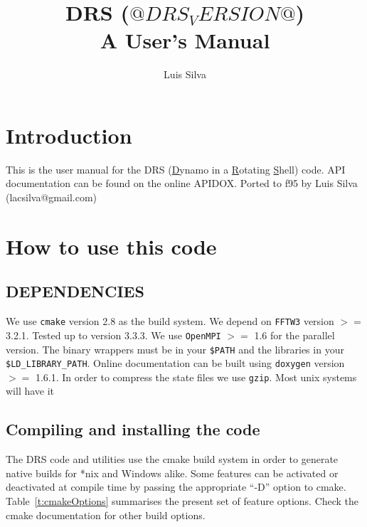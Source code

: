 \documentclass[a4paper,10pt]{book}
\title{DRS ($@DRS_VERSION@$) \\ A User's Manual}
\author{Luis Silva}
\begin{document}

\maketitle

\clearpage{}

\tableofcontents

\clearpage{}
\chapter*{Introduction}
This is the user manual for the DRS (\underline{D}ynamo in a
\underline{R}otating \underline{S}hell) code. API documentation can be found on
the online APIDOX.
Ported to f95 by Luis Silva (lacsilva@gmail.com)

\chapter{How to use this code}

\section{DEPENDENCIES}
We use \verb|cmake| version 2.8 as the build system.
We depend on \verb|FFTW3| version $>=$ 3.2.1. Tested up to version 3.3.3.
We use \verb|OpenMPI| $>=$ 1.6 for the parallel version. The binary wrappers must
be in your \verb|$PATH| and the libraries in your \verb|$LD_LIBRARY_PATH|.
Online documentation can be built using \verb|doxygen|  version $>=$ 1.6.1.
In order to compress the state files we use \verb|gzip|. Most unix systems will have it

\section{Compiling and installing the code}
The DRS code and utilities use the cmake build system in order to generate
native builds for *nix and Windows alike. Some features can be activated or
deactivated at compile time by passing the appropriate ``-D'' option to cmake.
Table~\ref{t:cmakeOptions} summarises the present set of feature options. Check
the cmake documentation \citep{CMakeDox} for other build options.
\end{document}
